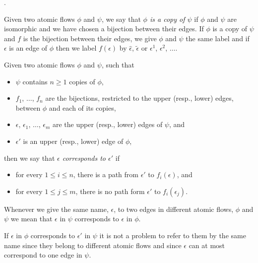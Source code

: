 


.


\begin{definition}
Given two atomic flows $\phi$ and $\psi$, we say that \emph{$\phi$ is a copy of $\psi$} if $\phi$ and $\psi$ are isomorphic and we have chosen a bijection between their edges. If $\phi$ is a copy of $\psi$ and $f$ is the bijection between their edges, we give $\phi$ and $\psi$ the same label and if $\epsilon$ is an edge of $\phi$ then we label $f(\epsilon)$ by $\hat\epsilon$, $\tilde\epsilon$ or $\epsilon^1$, $\epsilon^2$, $\dots$.
\end{definition}

\begin{definition}
Given two atomic flows $\phi$ and $\psi$, such that
\begin{itemize}
  \item $\psi$ contains $n\ge1$ copies of $\phi$,
  \item $f_1$, $\dots$, $f_n$ are the bijections, restricted to the upper (resp., lower) edges, between $\phi$ and each of its copies,
  \item $\epsilon$, $\epsilon_1$, $\dots$, $\epsilon_m$ are the upper (resp., lower) edges of $\psi$, and
  \item $\epsilon'$ is an upper (resp., lower) edge of $\phi$,
\end{itemize}
then we say that \emph{$\epsilon$ corresponds to $\epsilon'$} if
\begin{itemize}
  \item for every $1\le i\le n$, there is a path from $\epsilon'$ to $f_i(\epsilon)$, and
  \item for every $1\le j \le m$, there is no path form $\epsilon'$ to $f_i(\epsilon_j)$.
\end{itemize}
Whenever we give the same name, $\epsilon$, to two edges in different atomic flows, $\phi$ and $\psi$ we mean that $\epsilon$ in $\psi$ corresponds to $\epsilon$ in $\phi$.
\end{definition}

\begin{remark}
If $\epsilon$ in $\phi$ corresponds to $\epsilon'$ in $\psi$ it is not a problem to refer to them by the same name since they belong to different atomic flows and since $\epsilon$ can at most correspond to one edge in $\psi$.
\end{remark}


